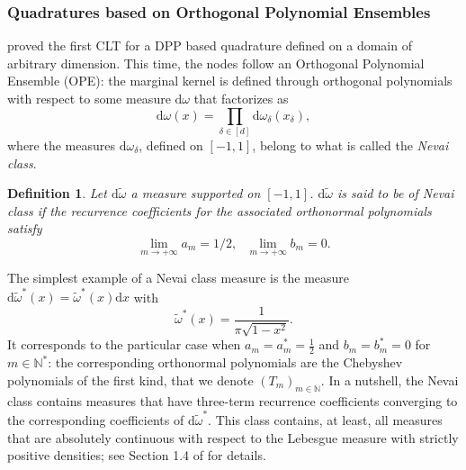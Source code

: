 \documentclass[twoside,11pt]{book}
\newtheorem{definition}{Definition}
\numberwithin{theorem}{chapter}
\numberwithin{definition}{chapter}
\numberwithin{proposition}{chapter}
\numberwithin{corollary}{chapter}
\numberwithin{example}{chapter}
\numberwithin{lemma}{chapter}
\numberwithin{assumption}{chapter}
\begin{document}
\subsubsection{Quadratures based on Orthogonal Polynomial Ensembles}
\cite{BaHa16} proved the first CLT for a DPP based quadrature defined on a domain of arbitrary dimension. This time, the nodes follow an Orthogonal Polynomial Ensemble (OPE): the marginal kernel is  defined through orthogonal polynomials with respect to some measure $\mathrm{d}\omega$ that factorizes as
\begin{equation}
\mathrm{d}\omega(x) = \prod\limits_{\delta \in [d]} \mathrm{d}\omega_{\delta}(x_{\delta}),
\end{equation}
where the measures $\mathrm{d}\omega_{\delta}$, defined on $[-1,1]$, belong to what is called the \emph{Nevai class}. 
\begin{definition}
Let $\mathrm{d}\tilde{\omega}$ a measure supported on $[-1,1]$. $\mathrm{d}\tilde{\omega}$ is said to be of Nevai class if 
the recurrence coefficients for
the associated orthonormal polynomials satisfy
\begin{equation}
\lim\limits_{m \rightarrow +\infty} a_{m} = 1/2, \:\:\: \lim\limits_{m \rightarrow +\infty} b_{m} = 0.
\end{equation}
\end{definition}
The simplest example of a Nevai class measure is the measure $\mathrm{d}\tilde{\omega}^{*}(x) = \tilde{\omega}^{*}(x) \mathrm{d}x$ with 
\begin{equation}\label{eq:omega_star}
\tilde{\omega}^{*}(x) = \frac{1}{\pi\sqrt{1-x^{2}}}.
\end{equation}
It corresponds to the particular case when $a_{m} = a^{*}_{m} = \frac{1}{2}$ and $b_m =  b^{*}_{m} =0$ for $m \in \mathbb{N}^{*}$: the corresponding orthonormal polynomials are the Chebyshev polynomials of the first kind, that we denote $(T_{m})_{m \in \mathbb{N}}$.
In a nutshell, the Nevai class contains measures that have three-term recurrence coefficients converging to the corresponding coefficients of $\mathrm{d}\tilde{\omega}^{*}$.
 This class contains, at least, all measures that are absolutely continuous with respect to the Lebesgue measure with strictly positive densities; see Section 1.4 of \citep{Sim10} for details. 
\end{document}
